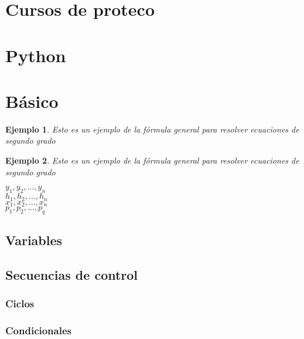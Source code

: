 \documentclass{IEEEtran}
\newtheorem{Ejem}{Ejemplo}[section]
\begin{document}
	\section{Cursos de proteco}
		\section{Python}
		\section{Básico}	
			
		\begin{Ejem}
			Esto es un ejemplo de la fórmula general para resolver ecuaciones de segundo grado
			\cuadratica
		\end{Ejem}	
			\begin{Ejem}
				Esto es un ejemplo de la fórmula general para resolver ecuaciones de segundo grado
				\cuadratica
			\end{Ejem}
			
			\newcommand{\Vector}{x_1, x_2, \dots, x_n}
			\newcommand{\vectorr}[1]{#1_1, #1_2,\dots, #1_n}
			\newcommand{\miVector}[2]{#1_1, #1_2,\dots, #1_#2}
			\newcommand{\unVector}[2][x]{#1_1, #1_2,\dots, #1_#2}
			
			\cuadratica
			
			$ \vectorr{y} $\\
			$ \vectorr{h} $\\			
			$ \Vector $\\
			$ \miVector{p}{q} $
			
			
			
			\lipsum[1-2]
			
			\cuadratica
			
			\lipsum[1-10]
			\subsection{Variables}	\lipsum[1-10]
			\subsection{Secuencias de control}	\lipsum[1-10]
				\subsubsection{Ciclos}	\lipsum[1-10]
				\subsubsection{Condicionales}	\lipsum[1-10]
\end{document}
